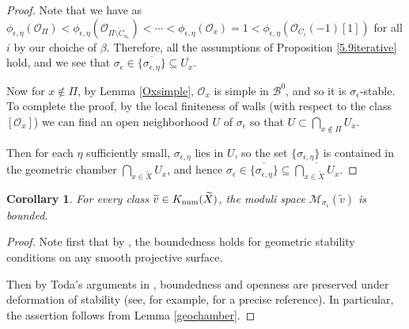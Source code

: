 \documentclass[12pt]{amsart}
\newtheorem{corollary}[theorem]{Corollary}
\theoremstyle{definition}
\DeclareMathOperator{\num}{num}
\DeclareMathOperator{\ch}{ch}
\begin{document}
\begin{proof}
Note that we have as $\phi_{\epsilon,\eta}(\mathcal{O}_\Pi)<\phi_{\epsilon,\eta}(\mathcal{O}_{\overline{\Pi\setminus C_{a_1}}})<\cdots<\phi_{\epsilon,\eta}(\mathcal{O}_x)=1<\phi_{\epsilon,\eta}(\mathcal{O}_{C_i}(-1)[1])$ for all $i$ by our choiche of $\beta$.
Therefore, all the assumptions of Proposition \ref{5.9iterative} hold, 
and we see that $\sigma_\epsilon \in \overline{\{\sigma_{\epsilon,\eta}\}}\subseteq \overline{U_x}$.

Now for $x \notin \Pi$, by Lemma \ref{Oxsimple}, $\mathcal{O}_x$ is simple in $\mathcal{B}^0$, and so it is $\sigma_\epsilon$-stable.
To complete the proof, by the local finiteness of walls (with respect to the class $[\mathcal{O}_x]$) we can find an open neighborhood $U$ of $\sigma_\epsilon$ so that $U\subset \bigcap_{x\notin\Pi}U_x$.

Then for each $\eta$ sufficiently small, $\sigma_{\epsilon,\eta}$ lies in $U$,
so the set $\{\sigma_{\epsilon,\eta}\}$ is  contained in the geometric chamber $\bigcap_{x\in\widetilde{X}}U_x$,
and hence $\sigma_\epsilon \in \overline{\{\sigma_{\epsilon,\eta}\}} \subseteq \overline{\bigcap_{x\in\widetilde{X}}U_x}$.
\end{proof}


\begin{corollary}\label{Bepsilon}
For every class $\widetilde{v} \in {\rm K}_{\num}(\widetilde{X})$, the moduli space $\mathcal{M}_{\sigma_\epsilon}(\widetilde{v})$ is bounded.
\end{corollary}
\begin{proof}
Note first that by \cite[Proposition 4.11]{Tod08}, the boundedness holds for geometric stability conditions on any smooth projective surface.

Then by Toda's arguments in \cite[Sect. 3]{Tod08}, boundedness and openness are preserved under deformation of stability (see, for example, \cite[Theorem 22.2]{BLM+} for a precise reference).
In particular, the assertion follows from Lemma \ref{geochamber}.
\end{proof}

\end{document}
